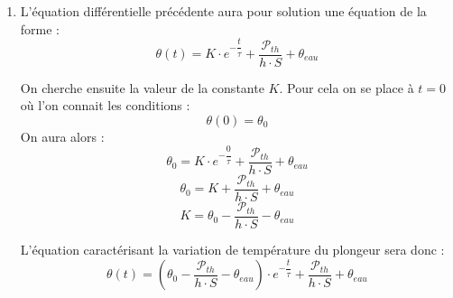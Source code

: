 \documentclass[a4paper,11pt,fleqn]{article}%
\begin{document}
\begin{enumerate}
		On posera alors $\tau = \dfrac{m \cdot c}{h\cdot S}$. Ce qui donnera l'expression suivante :
		$$ \dfrac{d\theta}{dt} + \dfrac{1}{\tau} \cdot \theta=  \dfrac{\mathcal{P}_{th}}{m \cdot c}  +\dfrac{ 1}{\tau} \cdot \theta_{eau}$$
		Pour pouvoir exprimer correctement la solution de l'équation différentielle il faut que le deuxième membre soit sous la forme $\dfrac{1}{\tau} \cdot cste$ on écrira donc :
		$$ \dfrac{d\theta}{dt} + \dfrac{1}{\tau} \cdot \theta=  \dfrac{1}{\tau \cdot h \cdot S} \cdot \mathcal{P}_{th}  +\dfrac{ 1}{\tau} \cdot \theta_{eau}$$
		$$ \dfrac{d\theta}{dt} + \dfrac{1}{\tau} \cdot \theta=  \dfrac{1}{\tau } \cdot \left(\dfrac{ \mathcal{P}_{th}}{h \cdot S} + \theta_{eau}\right)$$
		\item L'équation différentielle précédente aura pour solution une équation de la forme : $$\theta(t) = K \cdot e^{-\dfrac{t}{\tau}} + \dfrac{ \mathcal{P}_{th}}{h \cdot S} + \theta_{eau}$$
		
		On cherche ensuite la valeur de la constante $K$. Pour cela on se place à $t=0$ où l'on connait les conditions :
		$$ \theta(0) = \theta_0$$
		On aura alors : 
		 $$\theta_0 = K \cdot e^{-\dfrac{0}{\tau}} + \dfrac{ \mathcal{P}_{th}}{h \cdot S} + \theta_{eau}$$
		 $$\theta_0 = K + \dfrac{ \mathcal{P}_{th}}{h \cdot S} + \theta_{eau}$$
		 $$K = \theta_0 - \dfrac{ \mathcal{P}_{th}}{h \cdot S} - \theta_{eau} $$
		 
		 L'équation caractérisant la variation de température du plongeur sera donc : 
		 $$\theta(t) = \left( \theta_0 - \dfrac{ \mathcal{P}_{th}}{h \cdot S} - \theta_{eau}\right)\cdot e^{-\dfrac{t}{\tau}} + \dfrac{ \mathcal{P}_{th}}{h \cdot S} + \theta_{eau}$$
	\end{enumerate}
\end{document}

